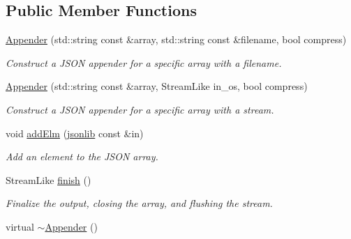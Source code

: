 \subsection*{Public Member Functions}
\begin{DoxyCompactItemize}
\item 
\hyperlink{structvt_1_1util_1_1json_1_1_appender_a6864b59ca45f5e832b7b60821d0dd8af}{Appender} (std\+::string const \&array, std\+::string const \&filename, bool compress)
\begin{DoxyCompactList}\small\item\em Construct a J\+S\+ON appender for a specific array with a filename. \end{DoxyCompactList}\item 
\hyperlink{structvt_1_1util_1_1json_1_1_appender_ad04c3e39085e114339e6fb7465048e08}{Appender} (std\+::string const \&array, Stream\+Like in\+\_\+os, bool compress)
\begin{DoxyCompactList}\small\item\em Construct a J\+S\+ON appender for a specific array with a stream. \end{DoxyCompactList}\item 
void \hyperlink{structvt_1_1util_1_1json_1_1_appender_a003145544b1a6a9013d69217528d2f4e}{add\+Elm} (\hyperlink{structvt_1_1util_1_1json_1_1_appender_aa822e25e24db1cdea96f00b79f55f492}{jsonlib} const \&in)
\begin{DoxyCompactList}\small\item\em Add an element to the J\+S\+ON array. \end{DoxyCompactList}\item 
Stream\+Like \hyperlink{structvt_1_1util_1_1json_1_1_appender_ab56d332c2a9c5f051d58dbec6803b780}{finish} ()
\begin{DoxyCompactList}\small\item\em Finalize the output, closing the array, and flushing the stream. \end{DoxyCompactList}\item 
virtual \hyperlink{structvt_1_1util_1_1json_1_1_appender_afc07753487e15d62f981c195d0ba6b17}{$\sim$\+Appender} ()
\end{DoxyCompactItemize}
